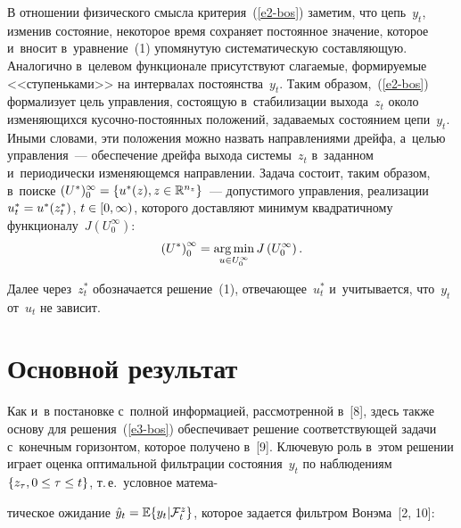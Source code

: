 \begin{multicols}{2}
     В отношении физического смысла критерия~(\ref{e2-bos}) заметим, что 
цепь~$y_t$, изменив состояние, некоторое время сохраняет постоянное 
значение, которое и~вносит в~уравнение~(1) упомянутую систематическую 
составляющую. Аналогично в~целевом функционале присутствуют 
слагаемые, фор\-ми\-ру\-емые <<ступеньками>> на интервалах 
постоянства~$y_t$. Таким образом,~(\ref{e2-bos}) формализует цель управ\-ле\-ния, 
состоящую в~стабилизации выхода~$z_t$ около из\-ме\-ня\-ющих\-ся  
ку\-соч\-но-по\-сто\-ян\-ных положений, задаваемых состоянием цепи~$y_t$. 
Иными словами, эти положения можно назвать на\-прав\-ле\-ни\-ями дрейфа, 
а~целью управ\-ле\-ния~--- обеспечение дрейфа выхода сис\-те\-мы~$z_t$ 
в~заданном и~периодически изменяющемся направлении. Задача со\-сто\-ит, 
таким образом, в~поиске $(U^*)_0^\infty\hm= \{u^*(z), z\hm\in 
\mathbb{R}^{n_z}\}$~--- допустимого управления, реализации $u_t^*\hm= 
u^*(z_t^*)$, $t\hm\in [0,\infty)$, которого доставляют минимум 
квадратичному функционалу~$J(U_0^\infty)$:
     \begin{equation}
     \left( U^*\right)_0^\infty =\mathop{\mathrm{arg}\,\mathrm{min}}\limits_{u\in U_0^\infty} J\left( 
U_0^\infty\right).
     \label{e3-bos}
     \end{equation} 
     
     \vspace*{-4pt}

     
     Далее через~$z_t^*$ обозначается решение~(1), отвечающее~$u_t^*$  
и~учитывается, что~$y_t$ от~$u_t$ не зависит.


\vspace*{-9pt}


\section{Основной результат}

\vspace*{-3pt}

     Как и~в постановке с~полной информацией, рассмотренной в~[8], здесь 
также основу для решения~(\ref{e3-bos}) обеспечивает решение 
соответствующей задачи с~конечным горизонтом, которое получено в~[9]. 
Ключевую роль в~этом решении играет оценка оптимальной фильтрации 
состояния~$y_t$ по наблюдениям $\{z_\tau, 0\hm\leq \tau\hm\leq t\}$, т.\,е.\ 
условное матема-\linebreak\vspace*{-12pt}

\pagebreak

\noindent
тическое ожидание $\hat{y}_t\hm= \mathbb{E}\{ y_t\vert 
\mathcal{F}_t^z\}$, которое задается фильтром Вонэма~[2, 10]:


\end{multicols}

